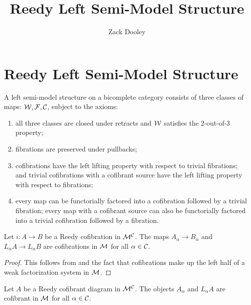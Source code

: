 \documentclass{amsart}
\title{Reedy Left Semi-Model Structure}
\author{Zack Dooley}
\date{}
\begin{document}
\maketitle

\section{Reedy Left Semi-Model Structure}

\begin{defn}
    A left semi-model structure on a bicomplete category consists of three classes of maps: $\mathcal{W},\mathcal{F},\mathcal{C}$, subject to the axioms:
    \begin{enumerate}
        \item all three classes are closed under retracts and $\mathcal{W}$ satisfies the 2-out-of-3 property;
        \item fibrations are preserved under pullbacks;
        \item cofibrations have the left lifting property with respect to trivial fibrations; and trivial cofibrations with a cofibrant source have the left lifting property with respect to fibrations;
        \item every map can be functorially factored into a cofibration followed by a trivial fibration; every map with a cofibrant source can also be functorially factored into a trivial cofibration followed by a fibration.
    \end{enumerate}
\end{defn}

\begin{lem}\label{lem:LA->LB cofib}
    Let $i:A\to B$ be a Reedy cofibration in $\mathcal{M}^{\mathcal{C}}$. The maps $A_\alpha\to B_\alpha$ and $L_\alpha A\to L_\alpha B$ are cofibrations in $\mathcal{M}$ for all $\alpha\in\mathcal{C}$.
\end{lem}
\begin{proof}
    This follows from \cite[Props. 15.3.9-10]{Hirshhorn} and the fact that cofibrations make up the left half of a weak factorization system in $\mathcal{M}$.
\end{proof}

\begin{cor}\label{lem:cofib objs}
    Let $A$ be a Reedy cofibrant diagram in $\mathcal{M}^{\mathcal{C}}$. The objects $A_\alpha$ and $L_\alpha A$ are cofibrant in $\mathcal{M}$ for all $\alpha\in\mathcal{C}$.
\end{cor}
\end{document}
